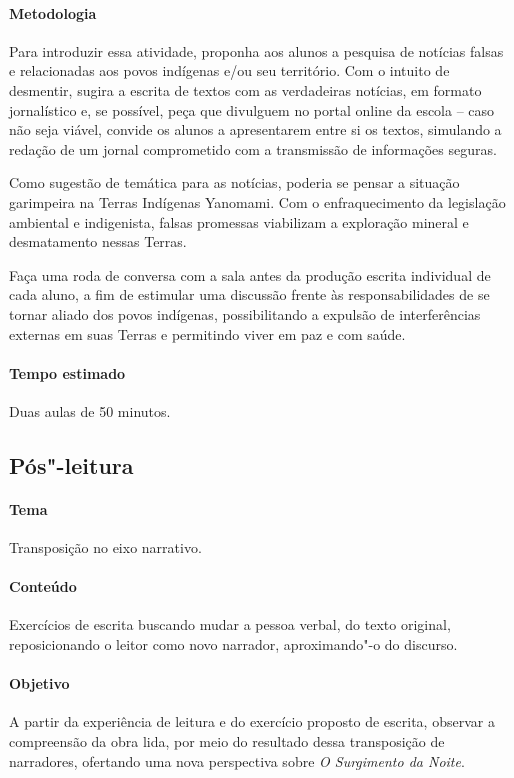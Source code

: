 \documentclass[12pt]{extarticle}
\begin{document}
{\paragraph{Metodologia} 

Para introduzir essa atividade, proponha aos alunos a pesquisa de notícias falsas e relacionadas
aos povos indígenas e/ou seu território. Com o intuito de desmentir, sugira a escrita de textos
com as verdadeiras notícias, em formato jornalístico e, se possível, peça que divulguem no
portal online da escola – caso não seja viável, convide os alunos a apresentarem entre si os textos, 
simulando a redação de um jornal comprometido com a transmissão de informações seguras.  

Como sugestão de temática para as notícias, poderia se pensar a situação garimpeira na Terras
Indígenas Yanomami. Com o enfraquecimento da legislação ambiental e indigenista, falsas promessas
viabilizam a exploração mineral e desmatamento nessas Terras.

Faça uma roda de conversa com a sala antes da produção escrita individual de cada aluno, a fim de
estimular uma discussão frente às responsabilidades de se tornar aliado dos povos indígenas, possibilitando a expulsão de interferências externas em suas Terras e permitindo viver em paz e com saúde.  

\paragraph{Tempo estimado} Duas aulas de 50 minutos.


\subsection{Pós"-leitura}

\paragraph{Tema} Transposição no eixo narrativo.

\paragraph{Conteúdo} Exercícios de escrita buscando mudar a pessoa verbal, 
do texto original, reposicionando o leitor como novo narrador, aproximando"-o
do discurso.

\paragraph{Objetivo} A partir da experiência de leitura e do exercício proposto
de escrita, observar a compreensão da obra lida, por meio do resultado dessa 
transposição de narradores, ofertando uma nova perspectiva sobre \textit{O Surgimento da Noite}. 

}
\end{document}
